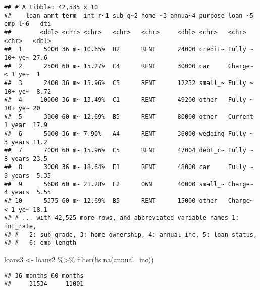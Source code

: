\documentclass[
]{article}
\newenvironment{Shaded}{\begin{snugshade}}{\end{snugshade}}
\newcommand{\FunctionTok}[1]{\textcolor[rgb]{0.00,0.00,0.00}{#1}}
\newcommand{\NormalTok}[1]{#1}
\newcommand{\OtherTok}[1]{\textcolor[rgb]{0.56,0.35,0.01}{#1}}
\newcommand{\SpecialCharTok}[1]{\textcolor[rgb]{0.00,0.00,0.00}{#1}}
\begin{document}
\begin{verbatim}
## # A tibble: 42,535 x 10
##    loan_amnt term  int_r~1 sub_g~2 home_~3 annua~4 purpose loan_~5 emp_l~6   dti
##        <dbl> <chr> <chr>   <chr>   <chr>     <dbl> <chr>   <chr>   <chr>   <dbl>
##  1      5000 36 m~ 10.65%  B2      RENT      24000 credit~ Fully ~ 10+ ye~ 27.6 
##  2      2500 60 m~ 15.27%  C4      RENT      30000 car     Charge~ < 1 ye~  1   
##  3      2400 36 m~ 15.96%  C5      RENT      12252 small_~ Fully ~ 10+ ye~  8.72
##  4     10000 36 m~ 13.49%  C1      RENT      49200 other   Fully ~ 10+ ye~ 20   
##  5      3000 60 m~ 12.69%  B5      RENT      80000 other   Current 1 year  17.9 
##  6      5000 36 m~ 7.90%   A4      RENT      36000 wedding Fully ~ 3 years 11.2 
##  7      7000 60 m~ 15.96%  C5      RENT      47004 debt_c~ Fully ~ 8 years 23.5 
##  8      3000 36 m~ 18.64%  E1      RENT      48000 car     Fully ~ 9 years  5.35
##  9      5600 60 m~ 21.28%  F2      OWN       40000 small_~ Charge~ 4 years  5.55
## 10      5375 60 m~ 12.69%  B5      RENT      15000 other   Charge~ < 1 ye~ 18.1 
## # ... with 42,525 more rows, and abbreviated variable names 1: int_rate,
## #   2: sub_grade, 3: home_ownership, 4: annual_inc, 5: loan_status,
## #   6: emp_length
\end{verbatim}

\begin{Shaded}
\begin{Highlighting}[]
\NormalTok{loans3 }\OtherTok{\textless{}{-}}\NormalTok{ loans2 }\SpecialCharTok{\%\textgreater{}\%}
  \FunctionTok{filter}\NormalTok{(}\SpecialCharTok{!}\FunctionTok{is.na}\NormalTok{(annual\_inc))}
\end{Highlighting}
\end{Shaded}

\begin{Shaded}
\end{Shaded}

\begin{verbatim}
## 36 months 60 months 
##     31534     11001
\end{verbatim}

\begin{Shaded}
\end{Shaded}
\end{document}
